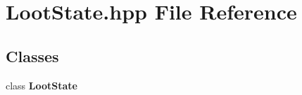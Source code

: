 \section{Loot\-State.\-hpp File Reference}
\label{_loot_state_8hpp}
\subsection*{Classes}
\begin{DoxyCompactItemize}
\item 
class {\bf Loot\-State}
\end{DoxyCompactItemize}
